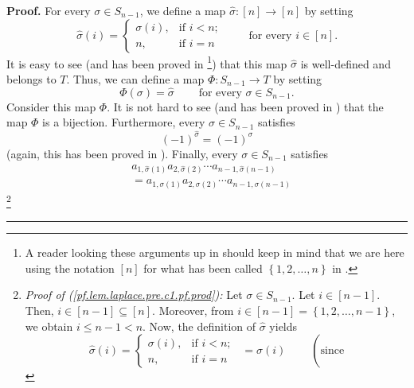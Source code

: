 \documentclass[numbers=enddot,12pt,final,onecolumn,notitlepage,english]{scrartcl}%
\theoremstyle{definition}
\newenvironment{proof}[1][Proof]{\noindent\textbf{#1.} }{\ \rule{0.5em}{0.5em}}
\newenvironment{verlong}{}{}
\begin{document}
\begin{verlong}
\begin{proof}
For every $\sigma\in S_{n-1}$, we define a map $\widehat{\sigma}:\left[
n\right]  \rightarrow\left[  n\right]  $ by setting%
\[
\widehat{\sigma}\left(  i\right)  =%
\begin{cases}
\sigma\left(  i\right)  , & \text{if }i<n;\\
n, & \text{if }i=n
\end{cases}
\ \ \ \ \ \ \ \ \ \ \text{for every }i\in\left[  n\right]  .
\]
It is easy to see (and has been proved in \cite[proof of Lemma 6.44]%
{detnotes}\footnote{A reader looking these arguments up in \cite[proof of
Lemma 6.44]{detnotes} should keep in mind that we are here using the notation
$\left[  n\right]  $ for what has been called $\left\{  1,2,\ldots,n\right\}
$ in \cite[proof of Lemma 6.44]{detnotes}.}) that this map $\widehat{\sigma}$
is well-defined and belongs to $T$. Thus, we can define a map $\Phi
:S_{n-1}\rightarrow T$ by setting%
\[
\Phi\left(  \sigma\right)  =\widehat{\sigma}\ \ \ \ \ \ \ \ \ \ \text{for
every }\sigma\in S_{n-1}.
\]
Consider this map $\Phi$. It is not hard to see (and has been proved in
\cite[proof of Lemma 6.44]{detnotes}) that the map $\Phi$ is a bijection.
Furthermore, every $\sigma\in S_{n-1}$ satisfies%
\begin{equation}
\left(  -1\right)  ^{\widehat{\sigma}}=\left(  -1\right)  ^{\sigma}
\label{pf.lem.laplace.pre.c1.pf.-1}%
\end{equation}
(again, this has been proved in \cite[proof of Lemma 6.44]{detnotes}).
Finally, every $\sigma\in S_{n-1}$ satisfies%
\begin{align}
&  a_{1,\widehat{\sigma}\left(  1\right)  }a_{2,\widehat{\sigma}\left(
2\right)  }\cdots a_{n-1,\widehat{\sigma}\left(  n-1\right)  }\nonumber\\
&  =a_{1,\sigma\left(  1\right)  }a_{2,\sigma\left(  2\right)  }\cdots
a_{n-1,\sigma\left(  n-1\right)  } \label{pf.lem.laplace.pre.c1.pf.prod}%
\end{align}
\footnote{\textit{Proof of (\ref{pf.lem.laplace.pre.c1.pf.prod}):} Let
$\sigma\in S_{n-1}$. Let $i\in\left[  n-1\right]  $. Then, $i\in\left[
n-1\right]  \subseteq\left[  n\right]  $. Moreover, from $i\in\left[
n-1\right]  =\left\{  1,2,\ldots,n-1\right\}  $, we obtain $i\leq n-1<n$. Now,
the definition of $\widehat{\sigma}$ yields
\[
\widehat{\sigma}\left(  i\right)  =%
\begin{cases}
\sigma\left(  i\right)  , & \text{if }i<n;\\
n, & \text{if }i=n
\end{cases}
\ \ =\sigma\left(  i\right)  \ \ \ \ \ \ \ \ \ \ \left(  \text{since
}\]}
\end{proof}
\end{verlong}
\end{document}
